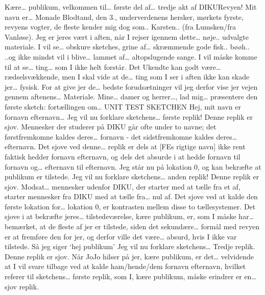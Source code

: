 \documentclass[a4paper,11pt]{article}
\begin{document}
\begin{sketch}
 Kære… publikum, velkommen til… første del af… tredje akt af DIKURevyen! Mit navn er… Monade Blodtand, den 3., underverdenens hersker, mørkets fyrste, revyens vogter, de fleste kender mig dog som.. Karsten.. (fra Lumsken/fra Vanløse). Jeg er jeres vært i aften, når I rejser igennem dette… nøje.. udvalgte materiale. I vil se… obskure sketches, grine af… skræmmende gode fisk.. bøøh.. 
 ..og ikke mindst vil i blive… lammet 
 af… altopslugende sange. I vil måske komme til at se… ting… som I ikke helt forstår. Det Ukendte kan godt være… rædselsvækkende, men I skal vide at de… ting som I ser i aften ikke kan skade jer… fysisk. For at give jer de… bedste forudsætninger vil jeg derfor vise jer vejen gennem aftenens… Materiale.
 Mine… damer og herrer…, lad mig… præsentere den første sketch: fortællingen om… UNIT TEST SKETCHEN
 Hej, mit navn er fornavn efternavn…
 Jeg vil nu forklare sketchens… første replik! Denne replik er sjov. Mennesker der studerer på DIKU går ofte under to navne; det førstfremkomne kaldes deres… fornavn - det sidstfremkomne kaldes deres… efternavn. Det sjove ved denne… replik er dels at [FEs rigtige navn] ikke rent faktisk hedder fornavn efternavn, og dels det absurde i at hedde fornavn til fornavn og… efternavn til efternavn.
 Jeg står nu på lokation 0, og kan bekræfte at publikum er tilstede.
 Jeg vil nu forklare sketchens… anden replik! Denne replik er sjov. Modsat… mennesker udenfor DIKU, der starter med at tælle fra et af, starter mennesker fra DIKU med at tælle fra… nul af. Det sjove ved at kalde den første lokation for… lokation 0, er kontrasten mellem disse to tællesystemer. Det sjove i at bekræfte jeres… tilstedeværelse, kære publikum, er, som I måske har… bemærket, at de fleste af jer er tilstede, siden det sekundære… formål med revyen er at fremføre den for jer, og derfor ville det være… absurd, hvis I ikke var tilstede.
 Så jeg siger ‘hej publikum’
 Jeg vil nu forklare sketchens… Tredje replik. Denne replik er sjov. Når JoJo hilser på jer, kære publikum, er det… velvidende at I vil svare tilbage ved at kalde ham/hende/dem fornavn efternavn, hvilket referer til sketchens… første replik, som I, kære publikum, måske erindrer er en… sjov replik.

\end{sketch}
\end{document}
